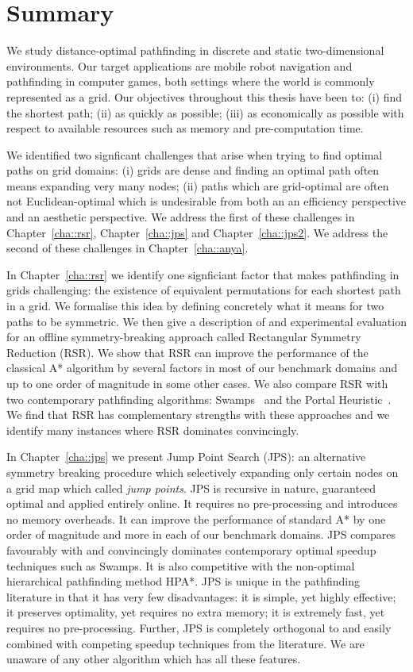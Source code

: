 \section{Summary}
\label{cha::conclusion::summary}
We study distance-optimal pathfinding in discrete and static two-dimensional
environments. Our target applications are mobile robot navigation and
pathfinding in computer games, both settings where the world is commonly
represented as a grid. Our objectives throughout this thesis have been to: (i)
find the shortest path; (ii) as quickly as possible; (iii) as economically as
possible with respect to available resources such as memory and
pre-computation time.

We identified two signficant challenges that arise when trying to find optimal
paths on grid domains: (i) grids are dense and finding an optimal path often
means expanding very many nodes; (ii) paths which are grid-optimal are often
not Euclidean-optimal which is undesirable from both an an efficiency
perspective and an aesthetic perspective. We address the first of these
challenges in Chapter~\ref{cha::rsr}, Chapter~\ref{cha::jps} and
Chapter~\ref{cha::jps2}.  We address the second of these challenges in
Chapter~\ref{cha::anya}.

In Chapter~\ref{cha::rsr} we identify one signficiant factor that makes
pathfinding in grids challenging: the existence of equivalent permutations for
each shortest path in a grid. We formalise this idea by defining concretely
what it means for two paths to be symmetric. We then give a description of and
experimental evaluation for an offline symmetry-breaking approach called
Rectangular Symmetry Reduction (RSR). We show that RSR can improve the
performance of the classical A{*} algorithm by several factors in most of our
benchmark domains and up to one order of magnitude in some other cases. We
also compare RSR with two contemporary pathfinding algorithms:
Swamps~\citep{pochter10} and the Portal Heuristic~\citep{goldenberg10}. We
find that RSR has complementary strengths with these approaches and we
identify many instances where RSR dominates convincingly.

In Chapter~\ref{cha::jps} we present Jump Point Search (JPS): an alternative
symmetry breaking procedure which selectively expanding only certain nodes on
a grid map which called \emph{jump points}.  JPS is recursive in nature,
guaranteed optimal and applied entirely online. It requires no pre-processing
and introduces no memory overheads. It can improve the performance of standard
A{*} by one order of magnitude and more in each of our benchmark domains. JPS
compares favourably with and convincingly dominates contemporary optimal
speedup techniques such as Swamps. It is also competitive with the non-optimal
hierarchical pathfinding method HPA{*}.  JPS is unique in the pathfinding
literature in that it has very few disadvantages: it is simple, yet highly
effective; it preserves optimality, yet requires no extra memory;  it is
extremely fast, yet requires no pre-processing.  Further, JPS is completely
orthogonal to and easily combined with competing speedup techniques from the
literature.  We are unaware of any other algorithm which has all these
features.

